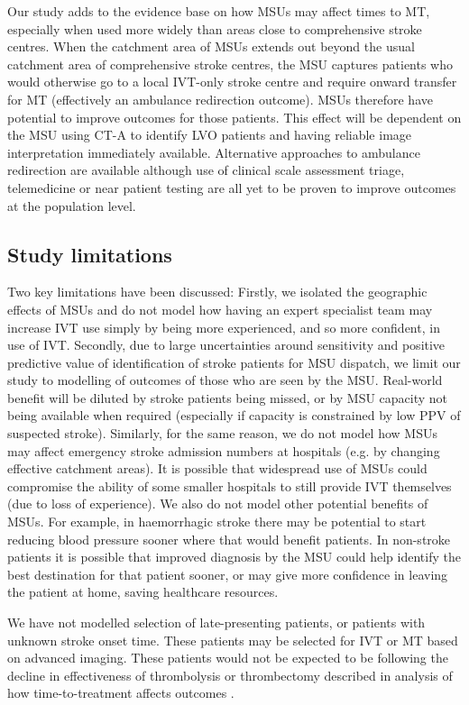 Our study adds to the evidence base on how MSUs may affect times to MT, especially when used more widely than areas close to comprehensive stroke centres. When the catchment area of MSUs extends out beyond the usual catchment area of comprehensive stroke centres, the MSU captures patients who would otherwise go to a local IVT-only stroke centre and require onward transfer for MT (effectively an ambulance redirection outcome). MSUs therefore have potential to improve outcomes for those patients. This effect will be dependent on the MSU using CT-A to identify LVO patients and having reliable image interpretation immediately available. Alternative approaches to ambulance redirection are available although use of clinical scale assessment triage, telemedicine or near patient testing are all yet to be proven to improve outcomes at the population level.

\subsection{Study limitations}

Two key limitations have been discussed: Firstly, we isolated the geographic effects of MSUs and do not model how having an expert specialist team may increase IVT use simply by being more experienced, and so more confident, in use of IVT. Secondly, due to large uncertainties around sensitivity and positive predictive value of identification of stroke patients for MSU dispatch, we limit our study to modelling of outcomes of those who are seen by the MSU. Real-world benefit will be diluted by stroke patients being missed, or by MSU capacity not being available when required (especially if capacity is constrained by low PPV of suspected stroke). Similarly, for the same reason, we do not model how MSUs may affect emergency stroke admission numbers at hospitals (e.g. by changing effective catchment areas). It is possible that widespread use of MSUs could compromise the ability of some smaller hospitals to still provide IVT themselves (due to loss of experience). We also do not model other potential benefits of MSUs. For example, in haemorrhagic stroke there may be potential to start reducing blood pressure sooner where that would benefit patients. In non-stroke patients it is possible that improved diagnosis by the MSU could help identify the best destination for that patient sooner, or may give more confidence in leaving the patient at home, saving healthcare resources.

We have not modelled selection of late-presenting patients, or patients with unknown stroke onset time. These patients may be selected for IVT or MT based on advanced imaging. These patients would not be expected to be following the decline in effectiveness of thrombolysis or thrombectomy described in analysis of how time-to-treatment affects outcomes \cite{emberson_effect_2014, fransen_time_2016}.

